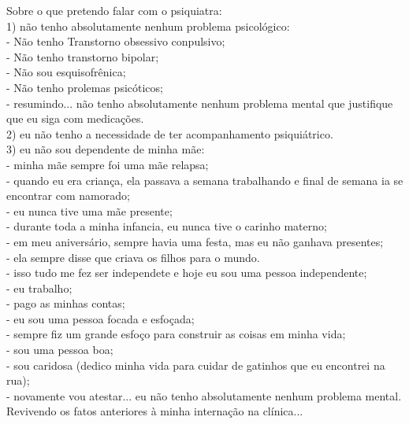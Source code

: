 \documentclass{book}
\begin{document}
Sobre o que pretendo falar com o psiquiatra: \\

1) não tenho absolutamente nenhum problema psicológico: \\

\noindent - Não tenho Transtorno obsessivo conpulsivo; \\
- Não tenho transtorno bipolar; \\
- Não sou esquisofrênica; \\
- Não tenho prolemas psicóticos; \\
- resumindo... não tenho absolutamente nenhum problema mental que justifique que eu siga com medicações. \\

2) eu não tenho a necessidade de ter acompanhamento psiquiátrico. \\

3) eu não sou dependente de minha mãe: \\

\noindent - minha mãe sempre foi uma mãe relapsa; \\
- quando eu era criança, ela passava a semana trabalhando e final de semana ia se encontrar com namorado; \\
- eu nunca tive uma mãe presente; \\
- durante toda a minha infancia, eu nunca tive o carinho materno; \\
- em meu aniversário, sempre havia uma festa, mas eu não ganhava presentes; \\
- ela sempre disse que criava os filhos para o mundo. \\

\noindent - isso tudo me fez ser independete e hoje eu sou uma pessoa independente; \\

\noindent - eu trabalho; \\
- pago as minhas contas; \\
- eu sou uma pessoa focada e esfoçada; \\
- sempre fiz um grande esfoço para construir as coisas em minha vida; \\
- sou uma pessoa boa; \\
- sou caridosa (dedico minha vida para cuidar de gatinhos que eu encontrei na rua); \\
- novamente vou atestar... eu não tenho absolutamente nenhum problema mental. \\

Revivendo os fatos anteriores à minha internação na clínica... \\
\end{document}
